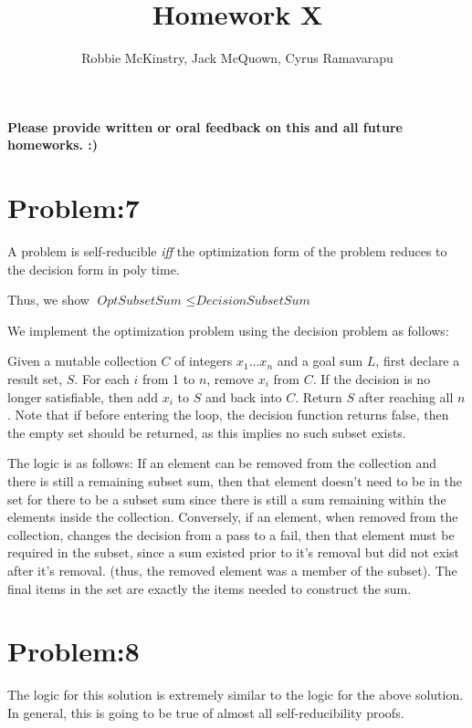 \documentclass[12pt]{article}
\begin{document}
\title{Homework X}
\author{Robbie McKinstry, Jack McQuown, Cyrus Ramavarapu}
\renewcommand{\today}{7 October 2016}
\renewcommand{\baselinestretch}{1.5}
\maketitle


\textbf{Please provide written or oral feedback on this and all future homeworks. :)}

\section*{Problem:7}
A problem is self-reducible \textit{iff} the optimization form of the problem reduces to the decision form in poly time.

Thus, we show $ \textit{OptSubsetSum } \leq \textit{DecisionSubsetSum }$

We implement the optimization problem using the decision problem as follows:

Given a mutable collection $C$ of integers $x_{1} \dots x_{n}$ and a goal sum $L$, first declare a result set, $S$.
For each $i$ from 1 to $n$, remove $x_{i}$ from $C$. If the decision is no longer satisfiable, then add $x_{i}$ to $S$ and back into $C$. Return $S$ after reaching all $n$. Note that if before entering the loop, the decision function returns false, then the empty set should be returned, as this implies no such subset exists.

The logic is as follows: If an element can be removed from the collection and there is still a remaining subset sum, then that element doesn't need to be in the set for there to be a subset sum since there is still a sum remaining within the elements inside the collection. Conversely, if an element, when removed from the collection, changes the decision from a pass to a fail, then that element must be required in the subset, since a sum existed prior to it's removal but did not exist after it's removal. (thus, the removed element was a member of the subset). The final items in the set are exactly the items needed to construct the sum.

\section*{Problem:8}

The logic for this solution is extremely similar to the logic for the above solution. In general, this is going to be true of almost all self-reducibility proofs.
\end{document}
